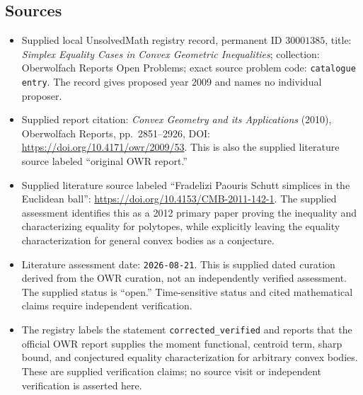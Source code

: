 \documentclass[11pt]{article}
\begin{document}
\subsection{Sources}
\begin{itemize}
\item Supplied local UnsolvedMath registry record, permanent ID \(30001385\), title: \emph{Simplex Equality Cases in Convex Geometric Inequalities}; collection: Oberwolfach Reports Open Problems; exact source problem code: \texttt{catalogue entry}. The record gives proposed year 2009 and names no individual proposer.
\item Supplied report citation: \emph{Convex Geometry and its Applications} (2010), Oberwolfach Reports, pp.\ 2851--2926, DOI: \url{https://doi.org/10.4171/owr/2009/53}. This is also the supplied literature source labeled ``original OWR report.''
\item Supplied literature source labeled ``Fradelizi Paouris Schutt simplices in the Euclidean ball'': \url{https://doi.org/10.4153/CMB-2011-142-1}. The supplied assessment identifies this as a 2012 primary paper proving the inequality and characterizing equality for polytopes, while explicitly leaving the equality characterization for general convex bodies as a conjecture.
\item Literature assessment date: \texttt{2026-08-21}. This is supplied dated curation derived from the OWR curation, not an independently verified assessment. The supplied status is ``open.'' Time-sensitive status and cited mathematical claims require independent verification.
\item The registry labels the statement \texttt{corrected\_verified} and reports that the official OWR report supplies the moment functional, centroid term, sharp bound, and conjectured equality characterization for arbitrary convex bodies. These are supplied verification claims; no source visit or independent verification is asserted here.
\end{itemize}
\end{document}
